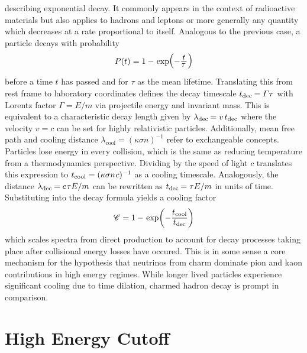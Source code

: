 describing exponential decay. It commonly appears in the context of radioactive materials but also applies to hadrons and leptons
or more generally any quantity which decreases at a rate proportional to itself. Analogous to the previous case, a particle
decays with probability
\begin{equation*}
	P(t) \kern+0.3pt = 1 - \kern+0.9pt \exp \kern-2.0pt
	\raisebox{0.25ex}{\(\Bigl( \raisebox{-0.25ex}{\(-\frac{\raisebox{-0.5ex}{$t$}}{\raisebox{1.0ex}{$\tau \kern+1.0pt$}}\)}
	\kern+0.5pt \Bigr)\)}
\end{equation*}
before a time $t$ has passed and for $\tau$ as the mean lifetime. Translating this from rest frame to laboratory coordinates defines
the decay timescale $t_\text{dec} \kern-0.6pt = \kern-0.4pt \varGamma\tau \kern+0.5pt$ with Lorentz factor $\varGamma = E / m$ via
projectile energy and invariant mass. This is equivalent to a characteristic decay length given by
$\lambda_\text{dec} \kern-0.5pt = v \kern+1.5pt t_\text{dec}$ where the velocity $v = c$ can be set for highly relativistic particles.
Additionally, mean free path and cooling distance $\lambda_\text{cool} = (\kappa\sigma n)^{-1}$ refer to exchangeable concepts. Particles
lose energy in every collision, which is the same as reducing temperature from a thermodynamics perspective. Dividing by the speed of
light $c$ translates this expression to $t_\text{cool} = (\kappa\sigma n \kern+0.5pt c)^{-1}$ as a cooling timescale. Analogously, the
distance $\lambda_\text{dec} \kern-0.5pt = c \kern+0.8pt \tau E / m$ can be rewritten as
$t_\text{dec} \kern-0.6pt = \tau E / m$ in units of time. Substituting into the decay formula yields a cooling factor
\begin{equation}
	\mathscr{C} = 1 - \kern+0.9pt \exp \biggl( -\frac{t_\text{cool}}{\raisebox{0.5ex}{$t_\text{dec}$}} \biggr)
	\label{eqn:cooling}
\end{equation}
which scales spectra from direct production to account for decay processes taking place after collisional energy losses have occured.
This is in some sense a core mechanism for the hypothesis that neutrinos from charm dominate pion and kaon contributions in high
energy regimes. While longer lived particles experience significant cooling due to time dilation, charmed hadron decay is prompt
in comparison.



\section{High Energy Cutoff}
\label{sec:cutoff}

